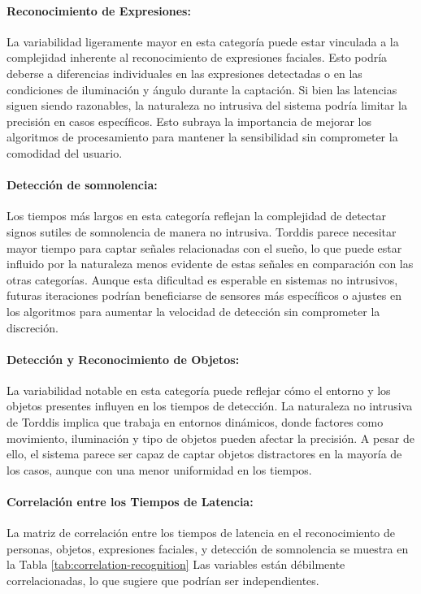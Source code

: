 \documentclass[a4paper,fleqn]{cas-sc}
\begin{document}
					\paragraph{Reconocimiento de Expresiones:}
						La variabilidad ligeramente mayor en esta categoría puede estar vinculada a la complejidad inherente al reconocimiento de expresiones faciales. Esto podría deberse a diferencias individuales en las expresiones detectadas o en las condiciones de iluminación y ángulo durante la captación. Si bien las latencias siguen siendo razonables, la naturaleza no intrusiva del sistema podría limitar la precisión en casos específicos. Esto subraya la importancia de mejorar los algoritmos de procesamiento para mantener la sensibilidad sin comprometer la comodidad del usuario.
					
					\paragraph{Detección de somnolencia:}
						Los tiempos más largos en esta categoría reflejan la complejidad de detectar signos sutiles de somnolencia de manera no intrusiva. Torddis parece necesitar mayor tiempo para captar señales relacionadas con el sueño, lo que puede estar influido por la naturaleza menos evidente de estas señales en comparación con las otras categorías. Aunque esta dificultad es esperable en sistemas no intrusivos, futuras iteraciones podrían beneficiarse de sensores más específicos o ajustes en los algoritmos para aumentar la velocidad de detección sin comprometer la discreción.
					
					\paragraph{Detección y Reconocimiento de Objetos:}
						La variabilidad notable en esta categoría puede reflejar cómo el entorno y los objetos presentes influyen en los tiempos de detección. La naturaleza no intrusiva de Torddis implica que trabaja en entornos dinámicos, donde factores como movimiento, iluminación y tipo de objetos pueden afectar la precisión. A pesar de ello, el sistema parece ser capaz de captar objetos distractores en la mayoría de los casos, aunque con una menor uniformidad en los tiempos.
					
					\paragraph{Correlación entre los Tiempos de Latencia:}
						La matriz de correlación entre los tiempos de latencia en el reconocimiento de personas, objetos, expresiones faciales, y detección de somnolencia se muestra en la Tabla \ref{tab:correlation-recognition}
						Las variables están débilmente correlacionadas, lo que sugiere que podrían ser independientes.
						
\end{document}
